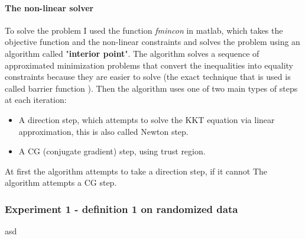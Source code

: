 \documentclass[]{article}
\begin{document}
\paragraph{The non-linear solver\\}
To solve the problem I used the function \textit{fmincon} in matlab, which takes the objective function and the non-linear constraints and solves the problem using an algorithm called "\textbf{interior point}". The algorithm solves a sequence of approximated minimization problems that convert the inequalities into equality constraints because they are easier to solve (the exact technique that is used is called barrier function \cite{barrier}). Then the algorithm uses one of two main types of steps at each iteration:
\begin{itemize}
	\item A direction step, which attempts to solve the KKT equation via linear approximation, this is also called Newton step.
	\item A CG (conjugate gradient) step, using trust region.
\end{itemize}
At first the algorithm attempts to take a direction step, if it cannot The algorithm attempts a CG step.




\subsubsection{Experiment 1 - definition 1 on randomized data}

asd

\printbibliography[
heading=bibintoc,
title={References}
]
\end{document}
